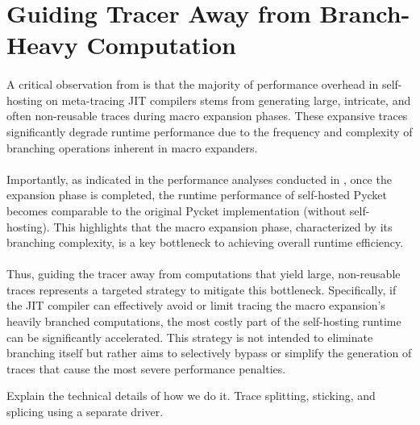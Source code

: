 	\section[\texorpdfstring{Guiding Tracer Away from Branch-Heavy Computation}{Hot Branches}]{Guiding Tracer Away from Branch-Heavy Computation}
    \label{section:hot-branches}

    \paragraph{}%
      A critical observation from  is that the majority of performance overhead in self-hosting on meta-tracing JIT compilers stems from generating large, intricate, and often non-reusable traces during macro expansion phases. These expansive traces significantly degrade runtime performance due to the frequency and complexity of branching operations inherent in macro expanders.

    \paragraph{}%
      Importantly, as indicated in the performance analyses conducted in , once the expansion phase is completed, the runtime performance of self-hosted Pycket becomes comparable to the original Pycket implementation (without self-hosting). This highlights that the macro expansion phase, characterized by its branching complexity, is a key bottleneck to achieving overall runtime efficiency.

    \paragraph{}%
      Thus, guiding the tracer away from computations that yield large, non-reusable traces represents a targeted strategy to mitigate this bottleneck. Specifically, if the JIT compiler can effectively avoid or limit tracing the macro expansion's heavily branched computations, the most costly part of the self-hosting runtime can be significantly accelerated. This strategy is not intended to eliminate branching itself but rather aims to selectively bypass or simplify the generation of traces that cause the most severe performance penalties.


    \begin{paragraph-here}
      Explain the technical details of how we do it. Trace splitting, sticking, and splicing using a separate driver.
    \end{paragraph-here}

